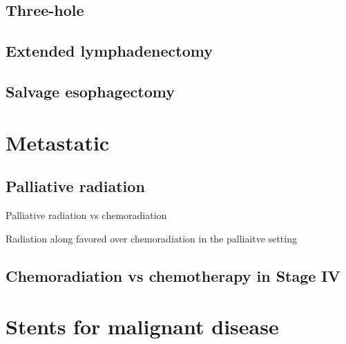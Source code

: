 \documentclass[
]{book}
\begin{document}
\hypertarget{three-hole}{%
\section{Three-hole}\label{three-hole}}

\hypertarget{extended-lymphadenectomy}{%
\section{Extended lymphadenectomy}\label{extended-lymphadenectomy}}

\hypertarget{salvage-esophagectomy}{%
\section{Salvage esophagectomy}\label{salvage-esophagectomy}}

\citep{markar922}

\citep{swisher175}

\hypertarget{eso_metastatic}{%
\chapter{Metastatic}\label{eso_metastatic}}

\hypertarget{palliative-radiation}{%
\section{Palliative radiation}\label{palliative-radiation}}

Palliative radiation vs chemoradiation \citep{penniment114}

Radiation along favored over chemoradiation in the palliaitve setting \citep{penniment114}

\hypertarget{chemoradiation-vs-chemotherapy-in-stage-iv}{%
\section{Chemoradiation vs chemotherapy in Stage IV}\label{chemoradiation-vs-chemotherapy-in-stage-iv}}

\citep{guttmann1131}

\hypertarget{stents-for-malignant-disease}{%
\chapter{Stents for malignant disease}\label{stents-for-malignant-disease}}

\citep{vakil1791}
\end{document}
